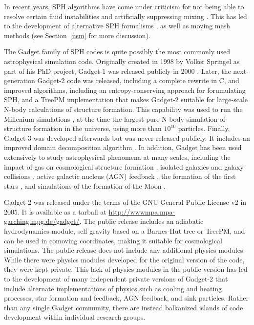 \documentclass[11pt,twoside]{article}
\begin{document}
In recent years, SPH algorithms have come under criticism for not being able to resolve certain fluid instabilities \citep{agertz2007} and artificially suppressing mixing \citep{read2010}. This has led to the development of alternative SPH formalisms \citep{abel2011, hopkins2013}, as well as moving mesh methods (see Section~\ref{usm} for more discussion).

The Gadget family of SPH codes is quite possibly the most commonly used astrophysical simulation code. Originally created in 1998 by Volker Springel as part of his PhD project, Gadget-1 was released publicly in 2000 \citep{springel2001}. Later, the next-generation Gadget-2 code was released, including a complete rewrite in C, and improved algorithms, including an entropy-conserving approach for forumulating SPH, and a TreePM implementation \citep{springel2005b} that makes Gadget-2 suitable for large-scale N-body calculations of structure formation. This capability was used to run the Millenium simulations \citep{springel2005a}, at the time the largest pure N-body simulation of structure formation in the universe, using more than $10^{10}$ particles. Finally, Gadget-3 was developed afterwards but was never released publicly. It includes an improved domain decomposition algorithm . In addition, Gadget has been used extensively to study astrophysical phenomena at many scales, including the impact of gas on cosmological structure formation \citep{keres2009, schaye2015}, isolated galaxies \citep{springel2005c} and galaxy collisions \citep{robertson2006}, active galactic nucleus (AGN) feedback \citep{sijacki2007}, the formation of the first stars \citep{clark2011}, and simulations of the formation of the Moon \citep{jackson2012}.

Gadget-2 was released under the terms of the GNU General Public License v2 in 2005. It is available as a tarball at \url{http://wwwmpa.mpa-garching.mpg.de/gadget/}. The public release includes an adiabatic hydrodynamics module, self gravity based on a Barnes-Hut tree or TreePM, and can be used in comoving coordinates, making it suitable for cosmological simulations. The public release does not include any additional physics modules. While there were physics modules developed for the original version of the code, they were kept private. This lack of physics modules in the public version has led to the development of many independent private versions of Gadget-2 that include alternate implementations of physics such as cooling and heating processes, star formation and feedback, AGN feedback, and sink particles. Rather than any single Gadget community, there are instead balkanized islands of code development within individual research groups.
\end{document}
